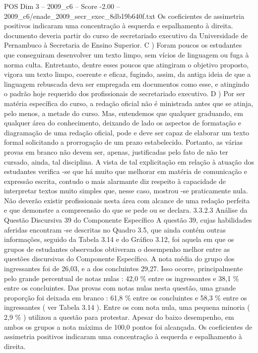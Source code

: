 \begin{textsample}{POS Dim 3 – 2009\_c6 – Score -2.00 – 2009\_c6/enade\_2009\_secr\_exec\_8db19b640f.txt}
Os coeficientes de assimetria positivos indicaram uma concentração à esquerda e espalhamento à direita. documento deveria partir do curso de secretariado executivo da Universidade de Pernambuco à Secretaria de Ensino Superior.
C ) Foram poucos os estudantes que conseguiram desenvolver um texto limpo, sem vícios de linguagem ou fuga à norma culta.
Entretanto, dentre esses poucos que atingiram o objetivo proposto, vigora um texto limpo, coerente e eficaz, fugindo, assim, da antiga ideia de que a linguagem rebuscada deva ser empregada em documentos como esse, e atingindo o padrão hoje requerido dos profissionais de secretariado executivo.
D ) Por ser matéria específica do curso, a redação oficial não é ministrada antes que se atinja, pelo menos, a metade do curso.
Mas, entendemos que qualquer graduando, em qualquer área do conhecimento, deixando de lado os aspectos de formatação e diagramação de uma redação oficial, pode e deve ser capaz de elaborar um texto formal solicitando a prorrogação de um prazo estabelecido.
Portanto, as várias provas em branco não devem ser, apenas, justificadas pelo fato de não ter cursado, ainda, tal disciplina.
A vista de tal explicitação em relação à atuação dos estudantes verifica -se que há muito que melhorar em matéria de comunicação e expressão escrita, contudo o mais alarmante diz respeito à capacidade de interpretar textos muito simples que, nesse caso, mostrou -se praticamente nula.
Não deverão existir profissionais nesta área com alcance de uma redação perfeita e que demonstre a compreensão do que se pede ou se declara. 3.3.2.3 Análise da Questão Discursiva 39 do Componente Específico A questão 39, cujas habilidades aferidas encontram -se descritas no Quadro 3.5, que ainda contém outras informações, seguido da Tabela 3.14 e do Gráfico 3.12, foi aquela em que os grupos de estudantes observados obtiveram o desempenho melhor entre as questões discursivas do Componente Específico.
A nota média do grupo dos ingressantes foi de 26,03, e a dos concluintes 29,27.
Isso ocorre, principalmente pelo grande percentual de notas nulas : 42,0 \% entre os ingressantes e 38,1 \% entre os concluintes.
Das provas com notas nulas nesta questão, uma grande proporção foi deixada em branco : 61,8 \% entre os concluintes e 58,3 \% entre os ingressantes ( ver Tabela 3.14 ).
Entre os com nota nula, uma pequena minoria ( 2,9 \% ) utilizou a questão para protestar.
Apesar do baixo desempenho, em ambos os grupos a nota máxima de 100,0 pontos foi alcançada.
Os coeficientes de assimetria positivos indicaram uma concentração à esquerda e espalhamento à direita.

\end{textsample}
